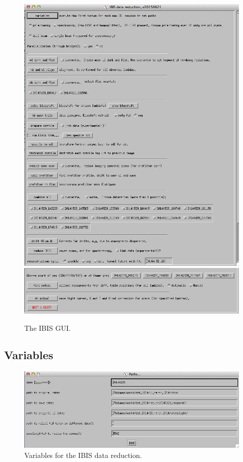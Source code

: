 \documentclass[a4paper,11pt]{article}
\begin{document}
\begin{figure}[!htb]
\includegraphics[width=.8\textwidth]{ibis2.png}
\includegraphics[width=.8\textwidth]{ibis3.png}
\caption{The IBIS GUI.\label{figgui}}
\end{figure}


\subsection{Variables}

\begin{figure}[htb]
\includegraphics[width=\textwidth]{ibis1.png}
\caption{Variables for the IBIS data reduction.\label{figvar}}
\end{figure}
\end{document}
